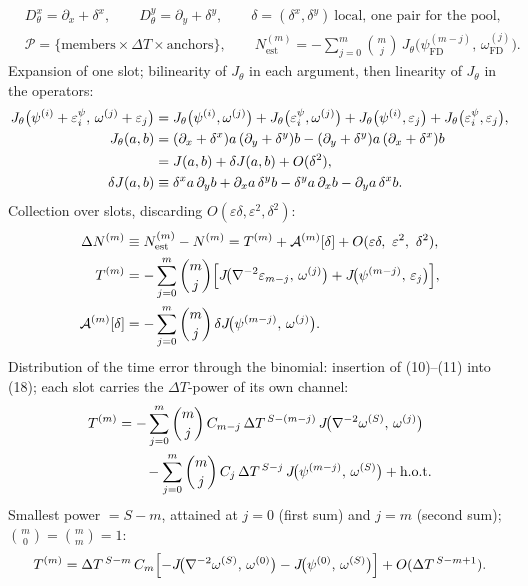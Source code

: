\documentclass[11pt]{article}
\newcommand{\DT}{\Delta T}
\begin{document}
\begin{align}
&D^x_\theta=\partial_x+\delta^x,\qquad D^y_\theta=\partial_y+\delta^y,\qquad
\delta=(\delta^x,\delta^y)\ \text{local, one pair for the pool},\\
&\mathcal{P}=\{\text{members}\times\DT\times\text{anchors}\},\qquad
N^{(m)}_{\mathrm{est}}
=-\sum_{j=0}^{m}\binom{m}{j}\,
J_\theta\!\bigl(\psi^{(m-j)}_{\mathrm{FD}},\,\omega^{(j)}_{\mathrm{FD}}\bigr).
\end{align}
Expansion of one slot; bilinearity of $J_\theta$ in each argument, then
linearity of $J_\theta$ in the operators:
\begin{align}
J_\theta\bigl(\psi^{(i)}+\varepsilon^{\psi}_{i},\,
\omega^{(j)}+\varepsilon_{j}\bigr)
&=J_\theta\bigl(\psi^{(i)},\omega^{(j)}\bigr)
+J_\theta\bigl(\varepsilon^{\psi}_{i},\omega^{(j)}\bigr)
+J_\theta\bigl(\psi^{(i)},\varepsilon_{j}\bigr)
+J_\theta\bigl(\varepsilon^{\psi}_{i},\varepsilon_{j}\bigr),\\
J_\theta(a,b)
&=(\partial_x+\delta^x)a\,(\partial_y+\delta^y)b
-(\partial_y+\delta^y)a\,(\partial_x+\delta^x)b\notag\\
&=J(a,b)+\delta J(a,b)+O(\delta^2),\\
\delta J(a,b)
&\equiv\delta^x a\,\partial_y b+\partial_x a\,\delta^y b
-\delta^y a\,\partial_x b-\partial_y a\,\delta^x b .
\end{align}
Collection over slots, discarding
$O(\varepsilon\delta,\varepsilon^2,\delta^2)$:
\begin{align}
\Delta N^{(m)}
&\equiv N^{(m)}_{\mathrm{est}}-N^{(m)}
= T^{(m)}+\mathcal{A}^{(m)}[\delta]
+O(\varepsilon\delta,\ \varepsilon^2,\ \delta^2),\\
T^{(m)}
&=-\sum_{j=0}^{m}\binom{m}{j}
\Bigl[J\!\bigl(\nabla^{-2}\varepsilon_{m-j},\,\omega^{(j)}\bigr)
+J\!\bigl(\psi^{(m-j)},\,\varepsilon_{j}\bigr)\Bigr],\\
\mathcal{A}^{(m)}[\delta]
&=-\sum_{j=0}^{m}\binom{m}{j}\,
\delta J\!\bigl(\psi^{(m-j)},\,\omega^{(j)}\bigr).
\end{align}
Distribution of the time error through the binomial: insertion of (10)--(11)
into (18); each slot carries the $\DT$-power of its own channel:
\begin{align}
T^{(m)}
&=-\sum_{j=0}^{m}\binom{m}{j}\,C_{m-j}\,\DT^{\,S-(m-j)}\,
J\!\bigl(\nabla^{-2}\omega^{(S)},\,\omega^{(j)}\bigr)\notag\\
&\qquad
-\sum_{j=0}^{m}\binom{m}{j}\,C_{j}\,\DT^{\,S-j}\,
J\!\bigl(\psi^{(m-j)},\,\omega^{(S)}\bigr)+\text{h.o.t.}
\end{align}
Smallest power $=S-m$, attained at $j=0$ (first sum) and $j=m$ (second sum);
$\binom{m}{0}=\binom{m}{m}=1$:
\begin{equation}
T^{(m)}
=\DT^{\,S-m}\,C_m\Bigl[
-J\!\bigl(\nabla^{-2}\omega^{(S)},\,\omega^{(0)}\bigr)
-J\!\bigl(\psi^{(0)},\,\omega^{(S)}\bigr)\Bigr]
+O(\DT^{\,S-m+1}).
\end{equation}
\end{document}
